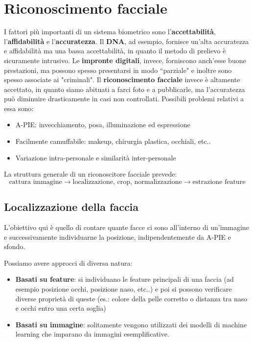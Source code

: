 \documentclass{article}
\begin{document}
\section{Riconoscimento facciale}
I fattori più importanti di un sistema biometrico sono l'\textbf{accettabilità}, l'\textbf{affidabilità} e l'\textbf{accuratezza}. Il \textbf{DNA}, ad esempio, fornisce un'alta accuratezza e affidabilità ma una bassa accettabilità, in quanto il metodo di prelievo è sicuramente intrusivo. Le \textbf{impronte digitali}, invece, forniscono anch'esse buone prestazioni, ma possono spesso presentarsi in modo ``parziale" e inoltre sono spesso associate ai "criminali". Il \textbf{riconoscimento facciale} invece è altamente accettato, in quanto siamo abituati a farci foto e a pubblicarle, ma l'accuratezza può diminuire drasticamente in casi non controllati. Possibili problemi relativi a essa sono:
\begin{itemize}
    \item A-PIE: invecchiamento, posa, illuminazione ed espressione
    \item Facilmente camuffabile: makeup, chirurgia plastica, occhiali, etc..
    \item Variazione intra-personale e similarità inter-personale
\end{itemize}

La struttura generale di un riconoscitore facciale prevede: 
$$\text{cattura immagine} \rightarrow \text{localizzazione, crop, normalizzazione} \rightarrow \text{estrazione feature}$$

\subsection{Localizzazione della faccia}
L'obiettivo qui è quello di contare quante facce ci sono all'interno di un'immagine e successivamente individuarne la posizione, indipendentemente da A-PIE e sfondo.

Possiamo avere approcci di diversa natura:
\begin{itemize}
    \item \textbf{Basati su feature}: si individuano le feature principali di una faccia (ad esempio posizione occhi, posizione naso, etc..) e poi si possono verificare diverse proprietà di queste (es.: colore della pelle corretto o distanza tra naso e occhi entro una certa soglia)
    \item \textbf{Basati su immagine}: solitamente vengono utilizzati dei modelli di machine learning che imparano da immagini esemplificative.
\end{itemize}
\end{document}
